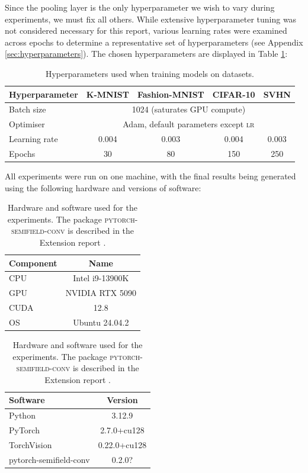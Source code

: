 \documentclass[a4paper, 12pt]{report}
\def\comment#1{\color{red}#1\color{black}}
\begin{document}
Since the pooling layer is the only hyperparameter we wish to vary during experiments, we must fix all others. While extensive hyperparameter tuning was not considered necessary for this report, various learning rates were examined across epochs to determine a representative set of hyperparameters (see Appendix \ref{sec:hyperparameters}). The chosen hyperparameters are displayed in Table \ref{table:hyperparameters}:

\begin{table}[!htbp]
\centering
\begin{tabular}{l|*4c}
\toprule
Hyperparameter & K-MNIST & Fashion-MNIST & CIFAR-10 & SVHN\\
\midrule
Batch size & \multicolumn{4}{c}{1024 (saturates GPU compute)}\\
Optimiser   &  \multicolumn{4}{c}{Adam, default parameters except \textsc{lr}} \\
Learning rate & 0.004 & 0.003 & 0.004 & 0.003 \\
Epochs & 30 & 80 & 150 & 250 \\
\bottomrule
\end{tabular}
\caption{Hyperparameters used when training models on datasets.}
\label{table:hyperparameters}
\end{table}
\noindent
All experiments were run on one machine, with the final results being generated using the following hardware and versions of software:

\begin{table}[!htbp]
\centering
\begin{tabular}{l|c}
\toprule
Component & Name \\
\midrule
CPU & Intel i9-13900K \\
GPU & NVIDIA RTX 5090 \\
CUDA & 12.8\\
OS & Ubuntu 24.04.2\\
\bottomrule
\end{tabular}
\quad
\begin{tabular}{l|c}
\toprule
Software & Version \\
\midrule
Python & 3.12.9 \\
PyTorch & 2.7.0+cu128 \\
TorchVision & 0.22.0+cu128 \\
\small pytorch-semifield-conv & \comment{0.2.0?} \\
\bottomrule
\end{tabular}

\caption{Hardware and software used for the experiments. The package \textsc{pytorch-semifield-conv} is described in the Extension report \cite{extension}.}
\vspace{-0.3cm}
\end{table}
\end{document}
